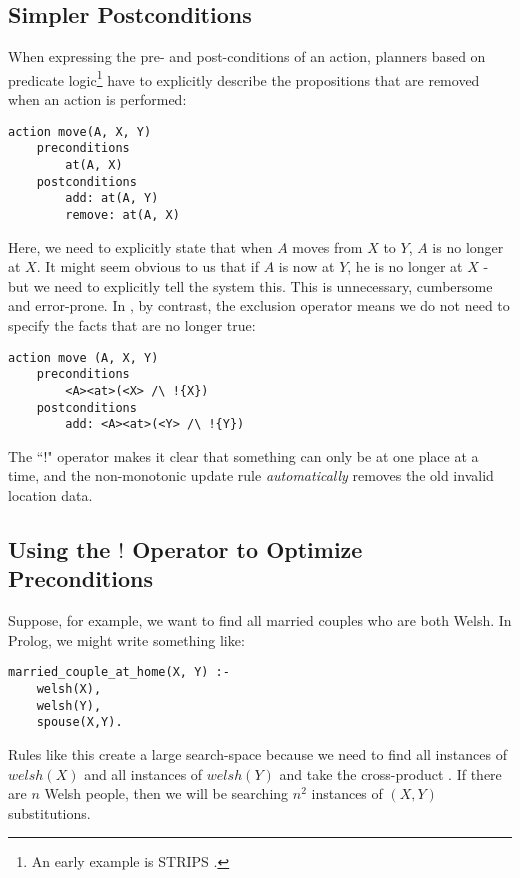 \subsection{Simpler Postconditions}
When expressing the pre- and post-conditions of an action, planners based on predicate logic\footnote{An early example is STRIPS \cite{strips}.} have to explicitly describe the propositions that are removed when an action is performed:
\begin{verbatim}
action move(A, X, Y)
    preconditions
        at(A, X)
    postconditions
        add: at(A, Y) 
        remove: at(A, X)
\end{verbatim}
Here, we need to explicitly state that when $A$ moves from $X$ to $Y$, $A$ is no longer at $X$. It might seem obvious to us that if $A$ is now at $Y$, he is no longer at $X$ - but we need to explicitly tell the system this. This is unnecessary, cumbersome and error-prone. In \ELFULL{}, by contrast, the exclusion operator means we do not need to specify the facts that are no longer true:
\begin{verbatim}
action move (A, X, Y)
    preconditions
        <A><at>(<X> /\ !{X})
    postconditions
        add: <A><at>(<Y> /\ !{Y})
\end{verbatim}
The ``!" operator makes it clear that something can only be at one place at a time, and the non-monotonic update rule \emph{automatically} removes the old invalid location data.

\subsection{Using the $!$ Operator to Optimize Preconditions}
\label{optimizingpreconditions}
Suppose, for example, we want to find all married couples who are both Welsh.
In Prolog, we might write something like:
\begin{verbatim}
married_couple_at_home(X, Y) :-
    welsh(X),
    welsh(Y),
    spouse(X,Y).
\end{verbatim}	
Rules like this create a large search-space because we need to find all instances of $welsh(X)$ and all instances of  $welsh(Y)$ and take the cross-product \cite{smith-and-genesereth}. If there are $n$ Welsh people, then we will be searching $n^2$ instances of $(X,Y)$ substitutions.

